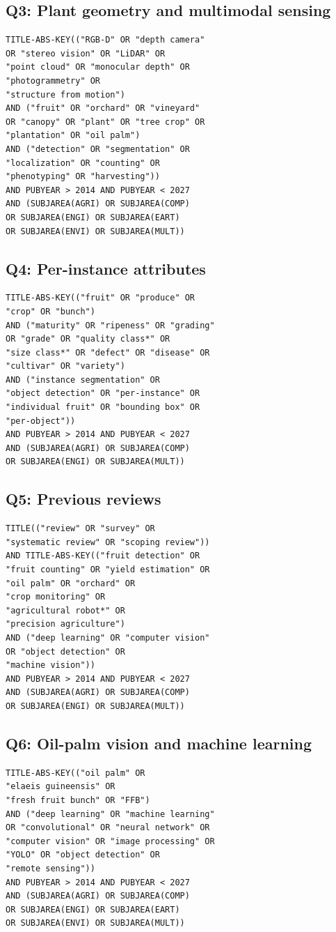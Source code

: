 \subsection*{Q3: Plant geometry and multimodal sensing}
\begin{verbatim}
TITLE-ABS-KEY(("RGB-D" OR "depth camera"
OR "stereo vision" OR "LiDAR" OR
"point cloud" OR "monocular depth" OR
"photogrammetry" OR
"structure from motion")
AND ("fruit" OR "orchard" OR "vineyard"
OR "canopy" OR "plant" OR "tree crop" OR
"plantation" OR "oil palm")
AND ("detection" OR "segmentation" OR
"localization" OR "counting" OR
"phenotyping" OR "harvesting"))
AND PUBYEAR > 2014 AND PUBYEAR < 2027
AND (SUBJAREA(AGRI) OR SUBJAREA(COMP)
OR SUBJAREA(ENGI) OR SUBJAREA(EART)
OR SUBJAREA(ENVI) OR SUBJAREA(MULT))
\end{verbatim}

\subsection*{Q4: Per-instance attributes}
\begin{verbatim}
TITLE-ABS-KEY(("fruit" OR "produce" OR
"crop" OR "bunch")
AND ("maturity" OR "ripeness" OR "grading"
OR "grade" OR "quality class*" OR
"size class*" OR "defect" OR "disease" OR
"cultivar" OR "variety")
AND ("instance segmentation" OR
"object detection" OR "per-instance" OR
"individual fruit" OR "bounding box" OR
"per-object"))
AND PUBYEAR > 2014 AND PUBYEAR < 2027
AND (SUBJAREA(AGRI) OR SUBJAREA(COMP)
OR SUBJAREA(ENGI) OR SUBJAREA(MULT))
\end{verbatim}

\subsection*{Q5: Previous reviews}
\begin{verbatim}
TITLE(("review" OR "survey" OR
"systematic review" OR "scoping review"))
AND TITLE-ABS-KEY(("fruit detection" OR
"fruit counting" OR "yield estimation" OR
"oil palm" OR "orchard" OR
"crop monitoring" OR
"agricultural robot*" OR
"precision agriculture")
AND ("deep learning" OR "computer vision"
OR "object detection" OR
"machine vision"))
AND PUBYEAR > 2014 AND PUBYEAR < 2027
AND (SUBJAREA(AGRI) OR SUBJAREA(COMP)
OR SUBJAREA(ENGI) OR SUBJAREA(MULT))
\end{verbatim}

\subsection*{Q6: Oil-palm vision and machine learning}
\begin{verbatim}
TITLE-ABS-KEY(("oil palm" OR
"elaeis guineensis" OR
"fresh fruit bunch" OR "FFB")
AND ("deep learning" OR "machine learning"
OR "convolutional" OR "neural network" OR
"computer vision" OR "image processing" OR
"YOLO" OR "object detection" OR
"remote sensing"))
AND PUBYEAR > 2014 AND PUBYEAR < 2027
AND (SUBJAREA(AGRI) OR SUBJAREA(COMP)
OR SUBJAREA(ENGI) OR SUBJAREA(EART)
OR SUBJAREA(ENVI) OR SUBJAREA(MULT))
\end{verbatim}

